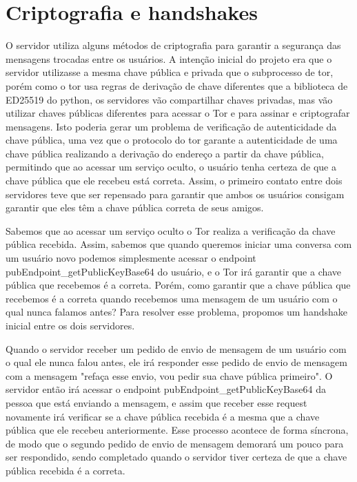 \section{Criptografia e handshakes}

O servidor utiliza alguns métodos de criptografia para garantir a segurança das mensagens trocadas entre os usuários. A intenção inicial do projeto era que o servidor utilizasse a mesma chave pública e privada que o subprocesso de tor, porém como o tor usa regras de derivação de chave diferentes que a biblioteca de ED25519 do python, os servidores vão compartilhar chaves privadas, mas vão utilizar chaves públicas diferentes para acessar o Tor e para assinar e criptografar mensagens. Isto poderia gerar um problema de verificação de autenticidade da chave pública, uma vez que o protocolo do tor garante a autenticidade de uma chave pública realizando a derivação do endereço a partir da chave pública, permitindo que ao acessar um serviço oculto, o usuário tenha certeza de que a chave pública que ele recebeu está correta. Assim, o primeiro contato entre dois servidores teve que ser repensado para garantir que ambos os usuários consigam garantir que eles têm a chave pública correta de seus amigos.

Sabemos que ao acessar um serviço oculto o Tor realiza a verificação da chave pública recebida. Assim, sabemos que quando queremos iniciar uma conversa com um usuário novo podemos simplesmente acessar o endpoint pubEndpoint\_getPublicKeyBase64 do usuário, e o Tor irá garantir que a chave pública que recebemos é a correta. Porém, como garantir que a chave pública que recebemos é a correta quando recebemos uma mensagem de um usuário com o qual nunca falamos antes? Para resolver esse problema, propomos um handshake inicial entre os dois servidores.

Quando o servidor receber um pedido de envio de mensagem de um usuário com o qual ele nunca falou antes, ele irá responder esse pedido de envio de mensagem com a mensagem "refaça esse envio, vou pedir sua chave pública primeiro". O servidor então irá acessar o endpoint pubEndpoint\_getPublicKeyBase64 da pessoa que está enviando a mensagem, e assim que receber esse request novamente irá verificar se a chave pública recebida é a mesma que a chave pública que ele recebeu anteriormente. Esse processo acontece de forma síncrona, de modo que o segundo pedido de envio de mensagem demorará um pouco para ser respondido, sendo completado quando o servidor tiver certeza de que a chave pública recebida é a correta.

